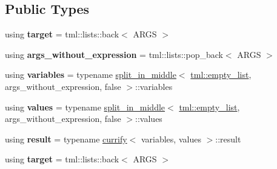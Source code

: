 \subsection*{Public Types}
\begin{DoxyCompactItemize}
\item 
\hypertarget{structtml_1_1impl_1_1multi__let__currifier_ab422a7d96048a577cc246d0be421db36}{using {\bfseries target} = tml\+::lists\+::back$<$ A\+R\+G\+S $>$}\label{structtml_1_1impl_1_1multi__let__currifier_ab422a7d96048a577cc246d0be421db36}

\item 
\hypertarget{structtml_1_1impl_1_1multi__let__currifier_ae30bf2ee476c981d43bc0187bf42b357}{using {\bfseries args\+\_\+without\+\_\+expression} = tml\+::lists\+::pop\+\_\+back$<$ A\+R\+G\+S $>$}\label{structtml_1_1impl_1_1multi__let__currifier_ae30bf2ee476c981d43bc0187bf42b357}

\item 
\hypertarget{structtml_1_1impl_1_1multi__let__currifier_ad331ebe4d1265c453e0da97605e19d27}{using {\bfseries variables} = typename \hyperlink{structtml_1_1impl_1_1multi__let__currifier_1_1split__in__middle}{split\+\_\+in\+\_\+middle}$<$ \hyperlink{structtml_1_1list}{tml\+::empty\+\_\+list}, args\+\_\+without\+\_\+expression, false $>$\+::variables}\label{structtml_1_1impl_1_1multi__let__currifier_ad331ebe4d1265c453e0da97605e19d27}

\item 
\hypertarget{structtml_1_1impl_1_1multi__let__currifier_a704710d5d8e1d144821bb56b2025eab8}{using {\bfseries values} = typename \hyperlink{structtml_1_1impl_1_1multi__let__currifier_1_1split__in__middle}{split\+\_\+in\+\_\+middle}$<$ \hyperlink{structtml_1_1list}{tml\+::empty\+\_\+list}, args\+\_\+without\+\_\+expression, false $>$\+::values}\label{structtml_1_1impl_1_1multi__let__currifier_a704710d5d8e1d144821bb56b2025eab8}

\item 
\hypertarget{structtml_1_1impl_1_1multi__let__currifier_aea293d4760e8c0d547d2459c9148dc98}{using {\bfseries result} = typename \hyperlink{structtml_1_1impl_1_1multi__let__currifier_1_1currify}{currify}$<$ variables, values $>$\+::result}\label{structtml_1_1impl_1_1multi__let__currifier_aea293d4760e8c0d547d2459c9148dc98}

\item 
\hypertarget{structtml_1_1impl_1_1multi__let__currifier_ab422a7d96048a577cc246d0be421db36}{using {\bfseries target} = tml\+::lists\+::back$<$ A\+R\+G\+S $>$}\label{structtml_1_1impl_1_1multi__let__currifier_ab422a7d96048a577cc246d0be421db36}


\end{DoxyCompactItemize}
